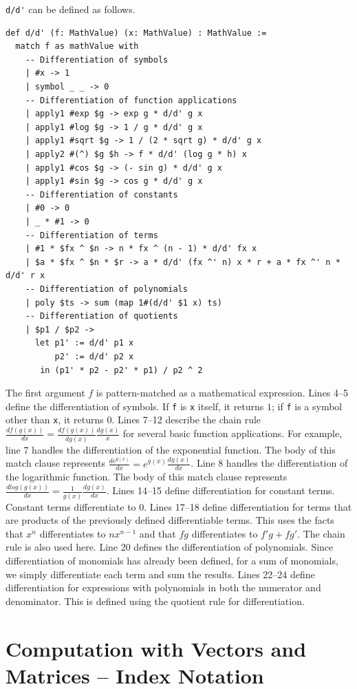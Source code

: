 \lstinline{d/d'} can be defined as follows.
\begin{lstlisting}[language=egison]
def d/d' (f: MathValue) (x: MathValue) : MathValue :=
  match f as mathValue with
    -- Differentiation of symbols
    | #x -> 1
    | symbol _ _ -> 0
    -- Differentiation of function applications
    | apply1 #exp $g -> exp g * d/d' g x
    | apply1 #log $g -> 1 / g * d/d' g x
    | apply1 #sqrt $g -> 1 / (2 * sqrt g) * d/d' g x
    | apply2 #(^) $g $h -> f * d/d' (log g * h) x
    | apply1 #cos $g -> (- sin g) * d/d' g x
    | apply1 #sin $g -> cos g * d/d' g x
    -- Differentiation of constants
    | #0 -> 0
    | _ * #1 -> 0
    -- Differentiation of terms
    | #1 * $fx ^ $n -> n * fx ^ (n - 1) * d/d' fx x
    | $a * $fx ^ $n * $r -> a * d/d' (fx ^' n) x * r + a * fx ^' n * d/d' r x
    -- Differentiation of polynomials
    | poly $ts -> sum (map 1#(d/d' $1 x) ts)
    -- Differentiation of quotients
    | $p1 / $p2 ->
      let p1' := d/d' p1 x
          p2' := d/d' p2 x
       in (p1' * p2 - p2' * p1) / p2 ^ 2
\end{lstlisting}
The first argument $f$ is pattern-matched as a mathematical expression.
Lines 4--5 define the differentiation of symbols.
If \lstinline{f} is \lstinline{x} itself, it returns $1$; if \lstinline{f} is a symbol other than \lstinline{x}, it returns $0$.
Lines 7--12 describe the chain rule $\frac{df(g(x))}{dx} = \frac{df(g(x))}{dg(x)} \frac{dg(x)}{x}$ for several basic function applications.
For example, line 7 handles the differentiation of the exponential function.
The body of this match clause represents $\frac{de^{g(x)}}{dx} = e^{g(x)} \frac{dg(x)}{dx}$.
Line 8 handles the differentiation of the logarithmic function.
The body of this match clause represents $\frac{dlog(g(x))}{dx} = \frac{1}{g(x)} \frac{dg(x)}{dx}$.
Lines 14--15 define differentiation for constant terms.
Constant terms differentiate to $0$.
Lines 17--18 define differentiation for terms that are products of the previously defined differentiable terms.
This uses the facts that $x^n$ differentiates to $n x^{n-1}$ and that $f g$ differentiates to $f' g + f g'$.
The chain rule is also used here.
Line 20 defines the differentiation of polynomials.
Since differentiation of monomials has already been defined, for a sum of monomials, we simply differentiate each term and sum the results.
Lines 22--24 define differentiation for expressions with polynomials in both the numerator and denominator.
This is defined using the quotient rule for differentiation.

\section{Computation with Vectors and Matrices -- Index Notation}\label{cas-linear}

